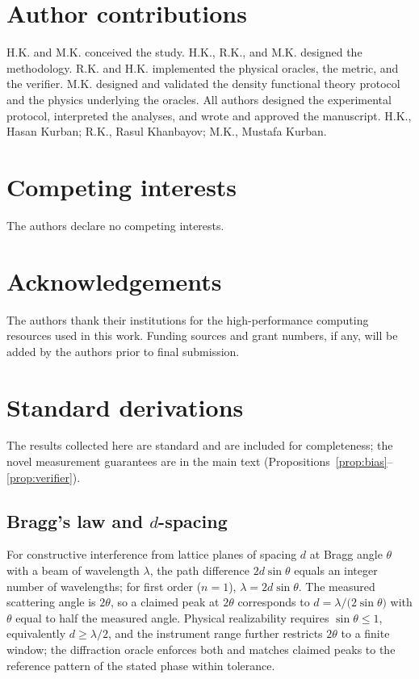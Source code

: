 \documentclass[pdflatex,sn-nature]{sn-jnl}
\begin{document}
\section*{Author contributions}
H.K. and M.K. conceived the study. H.K., R.K., and M.K. designed the methodology.
R.K. and H.K. implemented the physical oracles, the metric, and the verifier. M.K.
designed and validated the density functional theory protocol and the physics
underlying the oracles. All authors designed the experimental protocol, interpreted
the analyses, and wrote and approved the manuscript. H.K., Hasan Kurban; R.K., Rasul
Khanbayov; M.K., Mustafa Kurban.

\section*{Competing interests}
The authors declare no competing interests.

\section*{Acknowledgements}
The authors thank their institutions for the high-performance computing resources used
in this work. Funding sources and grant numbers, if any, will be added by the authors
prior to final submission.

\appendix
\section{Standard derivations}\label{app:standard}
The results collected here are standard and are included for completeness; the novel
measurement guarantees are in the main text (Propositions~\ref{prop:bias}--\ref{prop:verifier}).

\subsection{Bragg's law and \texorpdfstring{$d$}{d}-spacing}
For constructive interference from lattice planes of spacing $d$ at Bragg angle
$\theta$ with a beam of wavelength $\lambda$, the path difference $2d\sin\theta$ equals an
integer number of wavelengths; for first order ($n=1$), $\lambda=2d\sin\theta$. The
measured scattering angle is $2\theta$, so a claimed peak at $2\theta$ corresponds to
$d=\lambda/\!\big(2\sin\theta\big)$ with $\theta$ equal to half the measured angle.
Physical realizability requires $\sin\theta\le1$, equivalently $d\ge\lambda/2$, and the
instrument range further restricts $2\theta$ to a finite window; the diffraction oracle
enforces both and matches claimed peaks to the reference pattern of the stated phase
within tolerance.
\end{document}
